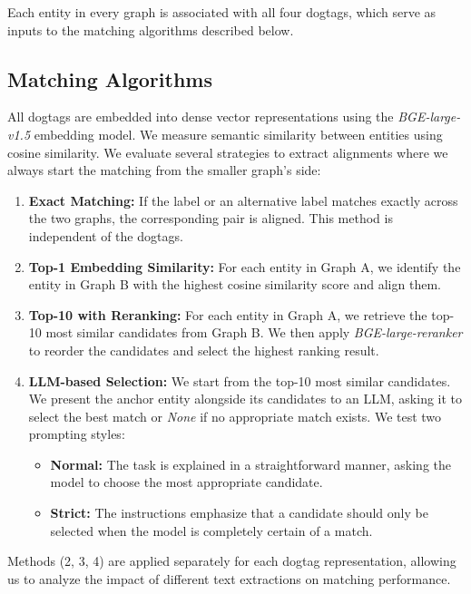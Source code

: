 \documentclass[11pt]{article}
\begin{document}
Each entity in every graph is associated with all four dogtags, which serve as inputs to the matching algorithms described below.

\subsection{Matching Algorithms}

All dogtags are embedded into dense vector representations using the \emph{BGE-large-v1.5} embedding model. We measure semantic similarity between entities using cosine similarity. We evaluate several strategies to extract alignments where we always start the matching from the smaller graph's side:

\begin{enumerate}[nosep]
    \setlength\itemsep{0em}
    \setlength\parskip{0em}
    \setlength\parsep{0em}
    \item \textbf{Exact Matching:} If the label or an alternative label matches exactly across the two graphs, the corresponding pair is aligned. This method is independent of the dogtags.
    \item \textbf{Top-1 Embedding Similarity:} For each entity in Graph A, we identify the entity in Graph B with the highest cosine similarity score and align them.
    \item \textbf{Top-10 with Reranking:} For each entity in Graph A, we retrieve the top-10 most similar candidates from Graph B. We then apply \emph{BGE-large-reranker} to reorder the candidates and select the highest ranking result.
    \item \textbf{LLM-based Selection:} We start from the top-10 most similar candidates. We present the anchor entity alongside its candidates to an LLM, asking it to select the best match or \textit{None} if no appropriate match exists. We test two prompting styles: 
    \begin{itemize}
        \item \textbf{Normal:} The task is explained in a straightforward manner, asking the model to choose the most appropriate candidate.  
        \item \textbf{Strict:} The instructions emphasize that a candidate should only be selected when the model is completely certain of a match.
    \end{itemize}

\end{enumerate}

Methods (2, 3, 4) are applied separately for each dogtag representation, allowing us to analyze the impact of different text extractions on matching performance.
\end{document}
